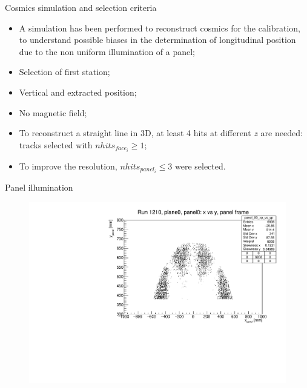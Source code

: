 \documentclass{beamer}[10pt]
\begin{document}
\begin{frame}{Cosmics simulation and selection criteria}
  \begin{itemize}
    \item A simulation has been performed to reconstruct cosmics for the calibration, to understand possible biases in 
    the determination of longitudinal position due to the non uniform illumination of a panel;
    \vspace{3mm}
    \item Selection of first station;
    \vspace{3mm}
    \item Vertical and extracted position;
    \vspace{3mm}
    \item No magnetic field;
    \vspace{3mm}
    \item To reconstruct a straight line in 3D, at least 4 hits at different $z$ are needed: tracks selected with $nhits_{face_i}\geq 1$;
    \vspace{3mm}
    \item To improve the resolution, $nhits_{panel_i}\leq 3$ were selected.
  \end{itemize}
\end{frame}
\begin{frame}{Panel illumination}
   
            \begin{figure}[H]
                \centering
                \includegraphics[width=0.8 \textwidth]{figures/pdf/xp_vs_yp_panel0.pdf}
                \label{fig:enter-label}
            \end{figure}

\end{frame}
\end{document}
